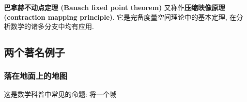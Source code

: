 

\textbf{巴拿赫不动点定理 (Banach fixed point theorem)} 又称作\textbf{压缩映像原理 (contraction mapping principle)}. 它是完备度量空间理论中的基本定理, 在分析数学的诸多分支中均有应用.

\subsection{两个著名例子}
\subsubsection{落在地面上的地图}
这是数学科普中常见的命题: 将一个城